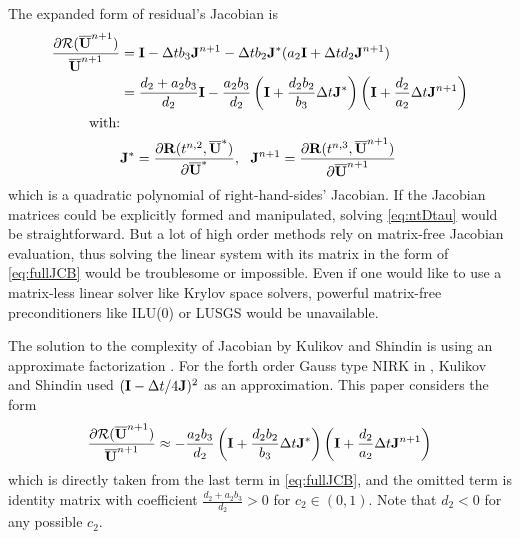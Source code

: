 \documentclass[preprint,12pt]{elsarticle}
\begin{document}
The expanded form of residual's Jacobian
is
\begin{equation}
    \label{eq:fullJCB}
    \begin{aligned}
        \frac{\partial \mathcal{R}(\overline{\mathbf{U}}^{n+1})}
        {\overline{\mathbf{U}}^{n+1}}
                     & = \mathbf{I} - \mathrm\Delta t b_3 \mathbf{J}^{n+1} -
        \mathrm\Delta t b_2\mathbf{J}^*(a_2\mathbf{I} +\mathrm\Delta t d_2 \mathbf{J}^{n+1})                                \\
                     & = \frac{d_2 + a_2b_3}{d_2}\mathbf{I}
        -\frac{a_2b_3}{d_2}\left(
        \mathbf{I} + \frac{d_2b_2}{b_3}\mathrm\Delta t\mathbf{J}^*
        \right)\left(
        \mathbf{I} + \frac{d_2}{a_2}\mathrm\Delta t\mathbf{J}^{n+1}
        \right)                                                                     \\
        \text{with:} &                                                              \\
                     & \mathbf{J}^* = \frac{\partial \mathbf{R}(t^{n,2},\overline{\mathbf{U}}^*)}{\partial \overline{\mathbf{U}}^*},\ \
        \mathbf{J}^{n+1} = \frac{\partial \mathbf{R}(t^{n,3},\overline{\mathbf{U}}^{n+1})}{\partial \overline{\mathbf{U}}^{n+1}}
    \end{aligned}
\end{equation}
which is a quadratic polynomial of right-hand-sides'
Jacobian.
If the Jacobian matrices could be explicitly formed and
manipulated, solving \eqref{eq:ntDtau} would be straightforward.
But a lot of high order methods rely on matrix-free
Jacobian evaluation, thus solving the linear system
with its matrix in the form of \eqref{eq:fullJCB}
would be troublesome or impossible.
Even if one would like to use a matrix-less linear solver
like Krylov space solvers,
powerful matrix-free preconditioners like ILU(0) or
LUSGS would be unavailable.

The solution to the complexity of Jacobian
by Kulikov and Shindin
is using an approximate factorization
\cite{kulikov2006familyNIRKOrig,kulikov2009adaptive}.
For the forth order
Gauss type NIRK in \cite{kulikov2006familyNIRKOrig},
Kulikov and Shindin used $(\mathbf{I}-\mathrm\Delta t /4 \mathbf{J})^2$
as an approximation.
This paper considers the form
\begin{equation}
    \label{eq:factJCB}
    \begin{aligned}
        \frac{\partial \mathcal{R}(\overline{\mathbf{U}}^{n+1})}
        {\overline{\mathbf{U}}^{n+1}}
         & \approx
        -\frac{a_2b_3}{d_2}\left(
        \mathbf{I} + \frac{d_2b_2}{b_3}\mathrm\Delta t\mathbf{J}^*
        \right)\left(
        \mathbf{I} + \frac{d_2}{a_2}\mathrm\Delta t\mathbf{J}^{n+1}
        \right)    \\
    \end{aligned}
\end{equation}
which is directly taken from the last term
in \eqref{eq:fullJCB}, and the omitted term
is identity matrix with coefficient $\frac{d_2 + a_2b_3}{d_2}>0$
for $c_2\in(0,1)$. Note that $d_2<0$ for any possible $c_2$.
\end{document}
